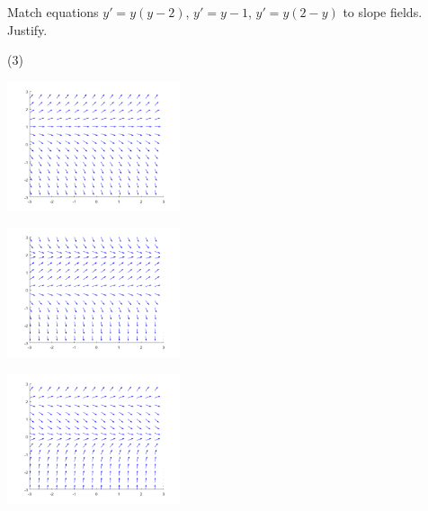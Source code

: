 \begin{exercise}
Match equations $y'=y(y-2)$, $y'=y-1$, $y' = y(2-y)$ to slope fields.
Justify.
\begin{tasks}(3)
\task
\parbox[c]{1.75in}{\includegraphics[width=2in]{Images/quivym1}}
\task
\parbox[c]{1.75in}{\includegraphics[width=2in]{Images/quivy2my}}
\task
\parbox[c]{1.75in}{\includegraphics[width=2in]{Images/quivyym2}}
\end{tasks}
\end{exercise}

